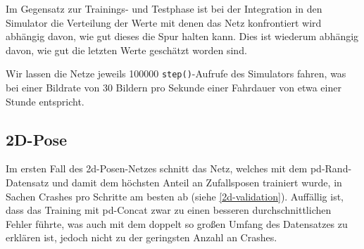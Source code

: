 Im Gegensatz zur Trainings- und Testphase ist bei der Integration in den Simulator die Verteilung der Werte mit denen das Netz konfrontiert wird abhängig davon, wie gut dieses die Spur halten kann. Dies ist wiederum abhängig davon, wie gut die letzten Werte geschätzt worden sind.

Wir lassen die Netze jeweils 100000 \texttt{step()}-Aufrufe des Simulators fahren, was bei einer Bildrate von 30 Bildern pro Sekunde einer Fahrdauer von etwa einer Stunde entspricht.\\

\subsection{2D-Pose}

Im ersten Fall des \acs{2d}-Posen-Netzes schnitt das Netz, welches mit dem \glqq\acs{pd}-Rand\grqq-Datensatz und damit dem höchsten Anteil an Zufallsposen trainiert wurde, in Sachen Crashes pro Schritte am besten ab (siehe \ref{2d-validation}). Auffällig ist, dass das Training mit \glqq\acs{pd}-Concat\grqq{} zwar zu einen besseren durchschnittlichen Fehler führte, was auch mit dem doppelt so großen Umfang des Datensatzes zu erklären ist, jedoch nicht zu der geringsten Anzahl an Crashes.  

